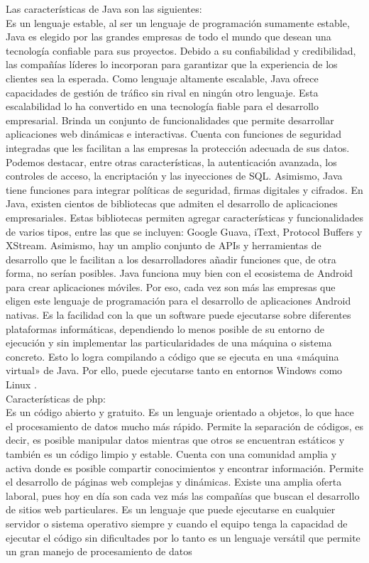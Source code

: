 Las características de Java son las siguientes: \\
Es un lenguaje estable, al ser un lenguaje de programación sumamente estable, Java es elegido por las grandes empresas de todo el mundo que desean una tecnología confiable para sus proyectos. Debido a su confiabilidad y credibilidad, las compañías líderes lo incorporan para garantizar que la experiencia de los clientes sea la esperada.
Como lenguaje altamente escalable, Java ofrece capacidades de gestión de tráfico sin rival en ningún otro lenguaje. Esta escalabilidad lo ha convertido en una tecnología fiable para el desarrollo empresarial. Brinda un conjunto de funcionalidades que permite desarrollar aplicaciones web dinámicas e interactivas.
Cuenta con funciones de seguridad integradas que les facilitan a las empresas la protección adecuada de sus datos. Podemos destacar, entre otras características, la autenticación avanzada, los controles de acceso, la encriptación y las inyecciones de SQL. Asimismo, Java tiene funciones para integrar políticas de seguridad, firmas digitales y cifrados.
En Java, existen cientos de bibliotecas que admiten el desarrollo de aplicaciones empresariales. Estas bibliotecas permiten agregar características y funcionalidades de varios tipos, entre las que se incluyen: Google Guava, iText, Protocol Buffers y XStream. Asimismo, hay un amplio conjunto de APIs y herramientas de desarrollo que le facilitan a los desarrolladores añadir funciones que, de otra forma, no serían posibles.
Java funciona muy bien con el ecosistema de Android para crear aplicaciones móviles. Por eso, cada vez son más las empresas que eligen este lenguaje de programación para el desarrollo de aplicaciones Android nativas.
Es la facilidad con la que un software puede ejecutarse sobre diferentes plataformas informáticas, dependiendo lo menos posible de su entorno de ejecución y sin implementar las particularidades de una máquina o sistema concreto. Esto lo logra compilando a código que se ejecuta en una «máquina virtual» de Java. Por ello, puede ejecutarse tanto en entornos Windows como Linux \cite{Tec}. \\

Características de php: \\
Es un código abierto y gratuito. Es un lenguaje orientado a objetos, lo que hace el procesamiento de datos mucho más rápido. 
Permite la separación de códigos, es decir, es posible manipular datos mientras que otros se encuentran estáticos y también es un código limpio y estable. 
Cuenta con una comunidad amplia y activa donde es posible compartir conocimientos y encontrar información. Permite el desarrollo de páginas web complejas y dinámicas. 
Existe una amplia oferta laboral, pues hoy en día son cada vez más las compañías que buscan el desarrollo de sitios web particulares. 
Es un lenguaje que puede ejecutarse en cualquier servidor o sistema operativo siempre y cuando el equipo tenga la capacidad de ejecutar el código sin dificultades por lo tanto es un lenguaje versátil que permite un gran manejo de procesamiento de datos \cite{ph} \\

